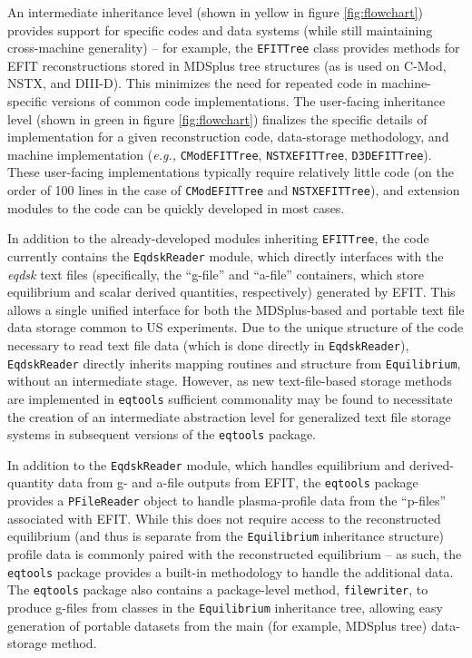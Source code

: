 \documentclass{elsarticle}
\newcommand{\eg}{\emph{e.g., }}
\newcommand{\eqtools}{\texttt{eqtools}\xspace}
\begin{document}
An intermediate inheritance level (shown in yellow in figure \ref{fig:flowchart}) provides support for specific codes and data systems (while still maintaining cross-machine generality) -- for example, the \verb|EFITTree| class provides methods for EFIT reconstructions stored in MDSplus tree structures (as is used on C-Mod, NSTX, and DIII-D).  
This minimizes the need for repeated code in machine-specific versions of common code implementations.  
The user-facing inheritance level (shown in green in figure \ref{fig:flowchart}) finalizes the specific details of implementation for a given reconstruction code, data-storage methodology, and machine implementation (\eg \verb|CModEFITTree|, \verb|NSTXEFITTree|, \verb|D3DEFITTree|).  
These user-facing implementations typically require relatively little code (on the order of 100 lines in the case of \verb|CModEFITTree| and \verb|NSTXEFITTree|), and extension modules to the code can be quickly developed in most cases.

In addition to the already-developed modules inheriting \verb|EFITTree|, the code currently contains the \verb|EqdskReader| module, which directly interfaces with the \emph{eqdsk} text files (specifically, the ``g-file'' and ``a-file'' containers, which store equilibrium and scalar derived quantities, respectively) generated by EFIT.  
This allows a single unified interface for both the MDSplus-based and portable text file data storage common to US experiments. 
Due to the unique structure of the code necessary to read text file data (which is done directly in \verb|EqdskReader|), \verb|EqdskReader| directly inherits mapping routines and structure from \verb|Equilibrium|, without an intermediate stage.
However, as new text-file-based storage methods are implemented in \eqtools sufficient commonality may be found to necessitate the creation of an intermediate abstraction level for generalized text file storage systems in subsequent versions of the \eqtools package.

In addition to the \verb|EqdskReader| module, which handles equilibrium and derived-quantity data from g- and a-file outputs from EFIT, the \eqtools package provides a \verb|PFileReader| object to handle plasma-profile data from the ``p-files'' associated with EFIT.  
While this does not require access to the reconstructed equilibrium (and thus is separate from the \verb|Equilibrium| inheritance structure) profile data is commonly paired with the reconstructed equilibrium -- as such, the \eqtools package provides a built-in methodology to handle the additional data.  
The \eqtools package also contains a package-level method, \verb|filewriter|, to produce g-files from classes in the \verb|Equilibrium| inheritance tree, allowing easy generation of portable datasets from the main (for example, MDSplus tree) data-storage method.
\end{document}
